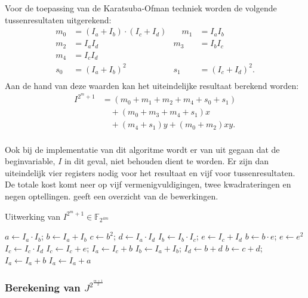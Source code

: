 Voor de toepassing van de Karatsuba-Ofman techniek worden de volgende tussenresultaten uitgerekend:
\[\begin{aligned}
m_0	&= (I_a + I_b) \cdot (I_c + I_d)
			&\quad m_1	&= I_a I_b\\
m_2	&= I_a I_d
			&m_3	&= I_b I_c\\
m_4	&= I_c I_d\\
s_0	&= (I_a + I_b)^2
			&s_1	&= (I_c + I_d)^2.\\
\end{aligned}\]
Aan de hand van deze waarden kan het uiteindelijke resultaat berekend worden:
\[\begin{aligned}
I^{2^m + 1}	&= (m_0 + m_1 + m_2 + m_4 + s_0 + s_1)\\
				&\quad + (m_0 + m_3 + m_4 + s_1) x \\
				&\quad + (m_4 + s_1) y + (m_0 + m_2) xy.\\
\end{aligned}\]

Ook bij de implementatie van dit algoritme wordt er van uit gegaan dat de beginvariable, $I$ in dit geval, niet behouden dient te worden. Er zijn dan uiteindelijk vier registers nodig voor het resultaat en vijf voor tussenresultaten. De totale kost komt neer op vijf vermenigvuldigingen, twee kwadrateringen en negen optellingen.  geeft een overzicht van de bewerkingen.

\begin{algorithm}[h]
	\caption{Uitwerking van $I^{2^m + 1} \in \mathbb{F}_{2^{4m}}$}
	\label{algoritme-implementatie-miller-v-power}
	$a \leftarrow I_a \cdot I_b$; $b \leftarrow I_a + I_b$\;
	$c \leftarrow b^2$; $d \leftarrow I_a \cdot I_d$\;
	$I_b \leftarrow I_b \cdot I_c$; $e \leftarrow I_c + I_d$\;
	$b \leftarrow b \cdot e$; $e \leftarrow e^2$\;
	$I_c \leftarrow I_c \cdot I_d$\; 
	$I_c \leftarrow I_c + e$; $I_a \leftarrow I_c + b$\;
	$I_b \leftarrow I_a + I_b$; $I_d \leftarrow b + d$\;
	$b \leftarrow c + d$; $I_a \leftarrow I_a + b$\;
	$I_a \leftarrow I_a + a$\;
\end{algorithm}

\subsubsection{Berekening van $J^{2^{\frac{m + 1}{2}}}$}


